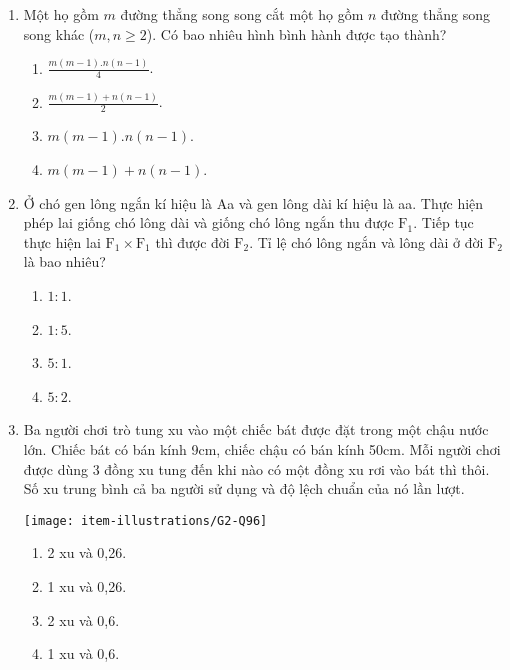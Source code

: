 \begin{enumerate}[label=\textbf{Câu \arabic*.},align=left,left=0cm..0cm,itemindent=*]
\begin{multicols}{4}
\begin{enumerate}[label=\textbf{\Alph*.},align=left,left=1cm..0cm,itemindent=*]
		\item $12$. \item $23$. \item $24$. \item $36$.
	\end{enumerate}\end{multicols}
	\item Một họ gồm $m$ đường thẳng song song cắt một họ gồm $n$ đường thẳng song song khác ($m,n\geqslant 2$). Có bao nhiêu hình bình hành được tạo thành?
	\begin{enumerate}[label=\textbf{\Alph*.},align=left,left=1cm..0cm,itemindent=*]
		\item $\frac{m(m-1).n(n-1)}{4}$. \item $\frac{m(m-1)+n(n-1)}{2}$. \item $m(m-1).n(n-1)$. \item $m(m-1)+n(n-1)$.
	\end{enumerate}
	\item Ở chó gen lông ngắn kí hiệu là Aa và gen lông dài kí hiệu là aa. Thực hiện phép lai giống chó lông dài và giống chó lông ngắn thu được $\text{F}_1$. Tiếp tục thực hiện lai $\text{F}_1\times \text{F}_1$ thì được đời $\text{F}_2$. Tỉ lệ chó lông ngắn và lông dài ở đời $\text{F}_2$ là bao nhiêu?
	\begin{multicols}{4}\begin{enumerate}[label=\textbf{\Alph*.},align=left,left=1cm..0cm,itemindent=*]
		\item $1:1$. \item $1:5$. \item $5:1$. \item $5:2$.
	\end{enumerate}\end{multicols}
	\item Ba người chơi trò tung xu vào một chiếc bát được đặt trong một chậu nước lớn. Chiếc bát có bán kính 9cm, chiếc chậu có bán kính 50cm. Mỗi người chơi được dùng 3 đồng xu tung đến khi nào có một đồng xu rơi vào bát thì thôi. Số xu trung bình cả ba người sử dụng và độ lệch chuẩn của nó lần lượt.\par
	{\centering\texttt{[image: item-illustrations/G2-Q96]}\par}
	\begin{enumerate}[label=\textbf{\Alph*.},align=left,left=1cm..0cm,itemindent=*]
		\item 2 xu và 0,26. \item 1 xu và 0,26. \item 2 xu và 0,6. \item 1 xu và 0,6.
	\end{enumerate}
\end{enumerate}

